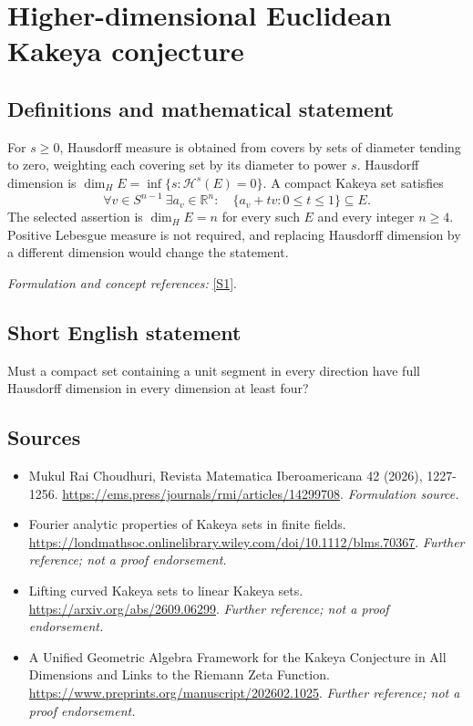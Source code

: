 \documentclass[11pt]{article}
\begin{document}
\section*{\texorpdfstring{Higher-dimensional Euclidean Kakeya conjecture}{Higher-dimensional Euclidean Kakeya conjecture}}\label{38}
\subsection{Definitions and mathematical statement}
For $s\ge0$, Hausdorff measure is obtained from covers by sets of diameter tending to zero, weighting each covering set by its diameter to power $s$. Hausdorff dimension is $\dim_H E=\inf\{s:\mathcal H^s(E)=0\}$. A compact Kakeya set satisfies
\[
 \forall v\in S^{n-1}\ \exists a_v\in{\mathbb{R}}^n:\quad
 \{a_v+tv:0\le t\le1\}\subseteq E.
\]
The selected assertion is $\dim_H E=n$ for every such $E$ and every integer $n\ge4$. Positive Lebesgue measure is not required, and replacing Hausdorff dimension by a different dimension would change the statement.
\par\smallskip\textit{Formulation and concept references:} \href{https://ems.press/journals/rmi/articles/14299708}{[S1]}.

\subsection{Short English statement}
Must a compact set containing a unit segment in every direction have full Hausdorff dimension in every dimension at least four?
\subsection{Sources}
\begin{itemize}
\item[S1]Mukul Rai Choudhuri, Revista Matematica Iberoamericana 42 (2026), 1227-1256.
\url{https://ems.press/journals/rmi/articles/14299708}.
\textit{Formulation source.}
\item[S2]Fourier analytic properties of Kakeya sets in finite fields.
\url{https://londmathsoc.onlinelibrary.wiley.com/doi/10.1112/blms.70367}.
\textit{Further reference; not a proof endorsement.}
\item[S3]Lifting curved Kakeya sets to linear Kakeya sets.
\url{https://arxiv.org/abs/2609.06299}.
\textit{Further reference; not a proof endorsement.}
\item[S4]A Unified Geometric Algebra Framework for the Kakeya Conjecture in All Dimensions and Links to the Riemann Zeta Function.
\url{https://www.preprints.org/manuscript/202602.1025}.
\textit{Further reference; not a proof endorsement.}
\end{itemize}
\end{document}
